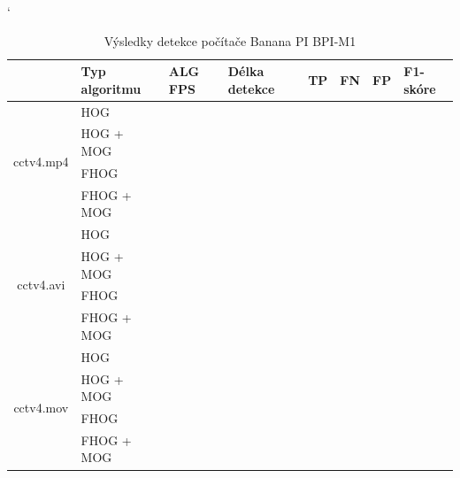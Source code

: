 \begin{table}[H]
\catcode`
\centering
\caption{Výsledky detekce počítače Banana PI BPI-M1}
\label{resultTabBPI}
\begin{tabular}{|c|l|l|l|l|l|l|l|}
\hline
                         & Typ algoritmu   & ALG FPS & Délka detekce & TP & FN & FP & F1-skóre \\ \hline
\multirow{4}{*}{cctv4.mp4} & HOG        &         &               &    &    &    &          \\ \cline{2-8} 
                         & HOG + MOG  &         &               &    &    &    &          \\ \cline{2-8} 
                         & FHOG       &         &               &    &    &    &          \\ \cline{2-8} 
                         & FHOG + MOG &         &               &    &    &    &          \\ \hline\hline 
\multirow{4}{*}{cctv4.avi} & HOG        &         &               &    &    &    &          \\ \cline{2-8} 
                         & HOG + MOG  &         &               &    &    &    &          \\ \cline{2-8} 
                         & FHOG       &         &               &    &    &    &          \\ \cline{2-8} 
                         & FHOG + MOG &         &               &    &    &    &          \\ \hline \hline
\multirow{4}{*}{cctv4.mov} & HOG        &         &               &    &    &    &          \\ \cline{2-8} 
                         & HOG + MOG  &         &               &    &    &    &          \\ \cline{2-8} 
                         & FHOG       &         &               &    &    &    &          \\ \cline{2-8} 
                         & FHOG + MOG &         &               &    &    &    &          \\ \hline
\end{tabular}
\end{table}

